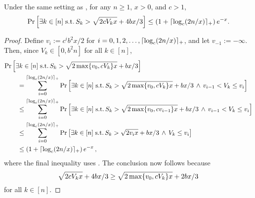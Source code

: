 \begin{corollary}
  \label{cor:freedman}
  Under the same setting as , for any $n \geq 1$,
  $x > 0$, and $c > 1$,
  \[
    \Pr\left[
      \exists k \in [n] \;\mathrm{s.t.}\,
      S_k > \sqrt{2cV_kx} + 4bx/3
    \right]
    \leq
    \left( 1 + \lceil\log_c(2n/x)\rceil_+ \right)
    e^{-x}
    .
  \]
\end{corollary}
\begin{proof}
  Define $v_i := c^i b^2x/2$ for $i = 0, 1, 2, \dotsc, \lceil
  \log_c(2n/x) \rceil_+$, and let $v_{-1} := -\infty$.
  Then, since $V_k \in [0,b^2n]$ for all $k\in[n]$,
  \begin{align*}
    \MoveEqLeft{
      \Pr\Brackets{
        \exists k \in [n] \;\st\,
        S_k > \sqrt{2\max\braces{v_0,cV_k}x} + bx/3
      }
    }
    \\
    & =
    \sum_{i=0}^{\ceil{\log_c(2n/x)}_+}
    \Pr\Brackets{
      \exists k \in [n] \;\st\,
      S_k > \sqrt{2\max\braces{v_0,cV_k}x} + bx/3
      \,\wedge\, v_{i-1} < V_k \leq v_i
    }
    \\
    & \leq
    \sum_{i=0}^{\ceil{\log_c(2n/x)}_+}
    \Pr\Brackets{
      \exists k \in [n] \;\st\,
      S_k > \sqrt{2\max\braces{v_0,cv_{i-1}}x} + bx/3
      \,\wedge\, v_{i-1} < V_k \leq v_i
    }
    \\
    & \leq
    \sum_{i=0}^{\ceil{\log_c(2n/x)}_+}
    \Pr\Brackets{
      \exists k \in [n] \;\st\,
      S_k > \sqrt{2v_ix} + bx/3
      \,\wedge\, V_k \leq v_i
    }
    \\
    & \leq
    \Parens{ 1 + \ceil{\log_c(2n/x)}_+ }
    e^{-x}\,,
  \end{align*}
  where the final inequality uses .
  The conclusion now follows because
  \[
    \sqrt{2cV_kx} + 4bx/3
    \geq \sqrt{2\max\{v_0,cV_k\}x} + 2bx/3
  \]
  for all $k \in [n]$.
\end{proof}

